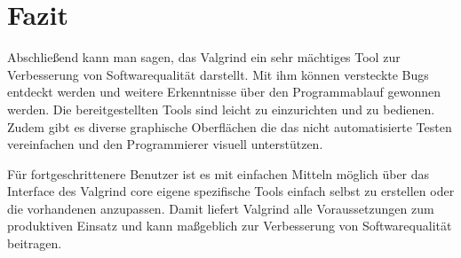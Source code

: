 \section{Fazit}
Abschließend kann man sagen, das Valgrind ein sehr mächtiges Tool zur Verbesserung von Softwarequalität darstellt. Mit ihm können versteckte Bugs entdeckt werden und weitere Erkenntnisse über den Programmablauf gewonnen werden. Die bereitgestellten Tools sind leicht zu einzurichten und zu bedienen. Zudem gibt es diverse graphische Oberflächen die das nicht automatisierte Testen vereinfachen und den Programmierer visuell unterstützen.

Für fortgeschrittenere Benutzer ist es mit einfachen Mitteln möglich über das Interface des Valgrind core eigene spezifische Tools einfach selbst zu erstellen oder die vorhandenen anzupassen. Damit liefert Valgrind alle Voraussetzungen zum produktiven Einsatz und kann maßgeblich zur Verbesserung von Softwarequalität beitragen.